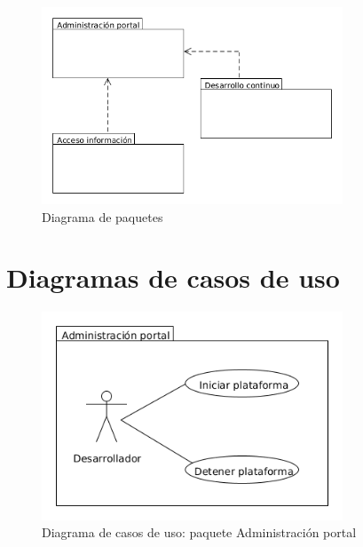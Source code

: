 \begin{figure}[!hbt]
  \begin{center}
  \includegraphics[width=0.8\textwidth]{imagenes/diagrama_paquetes.png}
  \caption{Diagrama de paquetes}
  \label{fig:diag_paquetes}
  \end{center}
\end{figure}
 
\newpage
\section{Diagramas de casos de uso}

\begin{figure}[!hbt]
  \begin{center}
  \includegraphics[width=0.8\textwidth]{imagenes/diagrama_casos_uso_administracion_portal.png}
  \caption{Diagrama de casos de uso: paquete Administración portal}
  \label{fig:diag_ca_us_ap}
  \end{center}
\end{figure}

